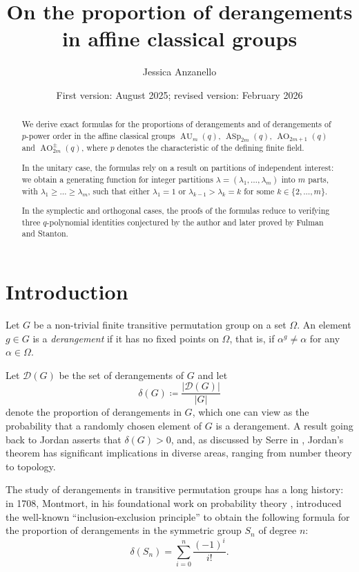 \documentclass[a4paper, 12pt, oneside]{amsart}
\title{On the proportion of derangements \\in affine classical groups}
\author[J.~Anzanello]{Jessica Anzanello}
\date{}
\theoremstyle{definition}
\newcommand{\D}{\mathcal{D}}
\DeclareMathOperator{\AU}{AU}
\DeclareMathOperator{\ASp}{ASp}
\DeclareMathOperator{\AO}{AO}
\begin{document}

\begin{abstract}
We derive exact formulas for the proportions of derangements and of derangements of $p$-power order in the affine classical groups $\AU_m(q)$, $\ASp_{2m}(q)$, $\AO_{2m+1}(q)$ and $\AO^{\pm}_{2m}(q)$, where $p$ denotes the characteristic of the defining finite field.

In the unitary case, the formulas rely on a result on partitions of independent interest: we obtain a generating function for integer partitions $\lambda=(\lambda_1, \dots, \lambda_m)$ into $m$ parts, with $\lambda_1\ge \dots \ge \lambda_m$, such that either $\lambda_1=1$ or $\lambda_{k-1}>\lambda_k=k$ for some $k \in \{2, \dots,m\}$.

In the symplectic and orthogonal cases, the proofs of the formulas reduce to verifying three $q$-polynomial identities conjectured by the author and later proved by Fulman and Stanton.
\end{abstract}
\date{First version: August 2025; revised version: February 2026}
\maketitle

\tableofcontents
\section{Introduction}
Let $G$ be a non-trivial finite transitive permutation group on a set $\Omega$. An element $g \in G$ is a \textit{derangement} if it has no fixed points on $\Omega$, that is, if $\alpha^g \neq \alpha$ for any $\alpha \in \Omega$. 

Let $\mathcal{D}(G)$ be the set of derangements of $G$ and let $$\delta(G) \coloneqq \frac{|\D(G)|}{|G|}$$ 
denote the proportion of derangements in $G$, which one can view as the probability that a randomly chosen element of $G$ is a derangement.
A result going back to Jordan asserts that $\delta(G)>0$, and, as discussed by Serre in \cite{Serre}, Jordan's theorem has significant implications in diverse areas, ranging from number theory to topology.

The study of derangements in transitive permutation groups has a long history: in 1708, Montmort, in his foundational work on probability theory \cite{Montmort},  introduced the well-known ``inclusion-exclusion principle'' to obtain the following formula for the proportion of derangements in the symmetric group $S_n$ of degree $n$:
\begin{equation*}
    \delta(S_n)=\sum_{i=0}^{n} \frac{(-1)^i}{i!}.
\end{equation*}
\end{document}
